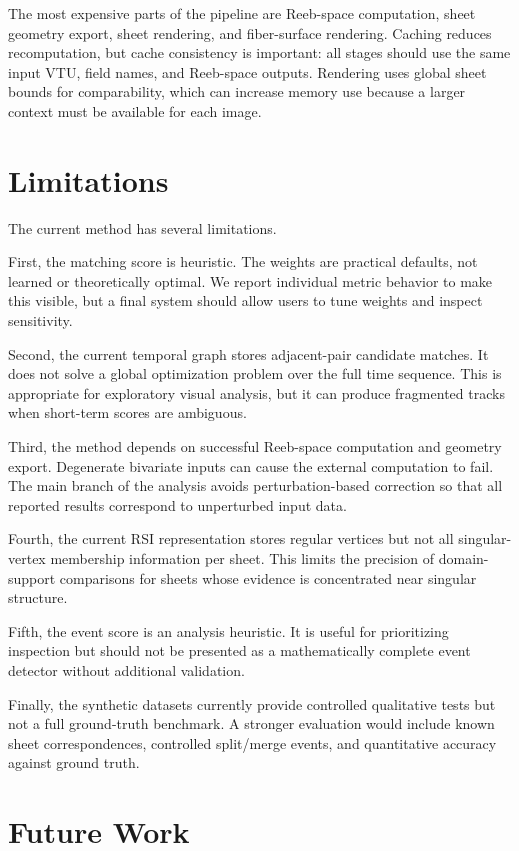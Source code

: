 The most expensive parts of the pipeline are Reeb-space computation, sheet
geometry export, sheet rendering, and fiber-surface rendering. Caching reduces
recomputation, but cache consistency is important: all stages should use the
same input VTU, field names, and Reeb-space outputs. Rendering uses global
sheet bounds for comparability, which can increase memory use because a larger
context must be available for each image.

\section{Limitations}

The current method has several limitations.

First, the matching score is heuristic. The weights are practical defaults, not
learned or theoretically optimal. We report individual metric behavior to make
this visible, but a final system should allow users to tune weights and inspect
sensitivity.

Second, the current temporal graph stores adjacent-pair candidate matches. It
does not solve a global optimization problem over the full time sequence. This
is appropriate for exploratory visual analysis, but it can produce fragmented
tracks when short-term scores are ambiguous.

Third, the method depends on successful Reeb-space computation and geometry
export. Degenerate bivariate inputs can cause the external computation to fail.
The main branch of the analysis avoids perturbation-based correction so that
all reported results correspond to unperturbed input data.

Fourth, the current RSI representation stores regular vertices but not all
singular-vertex membership information per sheet. This limits the precision of
domain-support comparisons for sheets whose evidence is concentrated near
singular structure.

Fifth, the event score is an analysis heuristic. It is useful for prioritizing
inspection but should not be presented as a mathematically complete event
detector without additional validation.

Finally, the synthetic datasets currently provide controlled qualitative tests
but not a full ground-truth benchmark. A stronger evaluation would include
known sheet correspondences, controlled split/merge events, and quantitative
accuracy against ground truth.

\section{Future Work}

